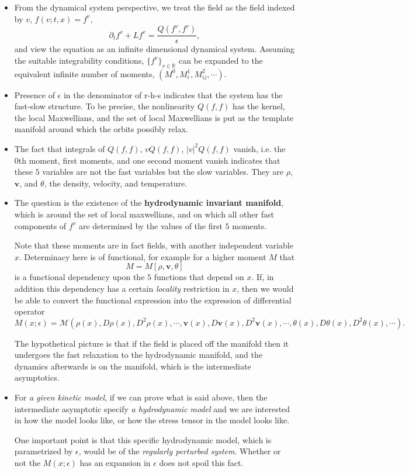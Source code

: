 \documentclass[a4paper,12pt]{article}
\begin{document}
\begin{itemize}
 \item From the dynamical system perspective, we treat the field as the field indexed by $v$, $f(v;t,x)=f^v$,
$$ \partial_t f^{v} + Lf^{v} = \frac{Q(f^v,f^v)}{\epsilon}, $$
and view the equation as an infinite dimensional dynamical system. Assuming the suitable integrability conditions, $\{f^v\}_{v\in \mathbb{R}}$ can be expanded to the equivalent infinite number of moments, $(M^0, M^1_{i}, M^2_{ij}, \cdots)$.
 \item Presence of $\epsilon$ in the denominator of r-h-s indicates that the system has the fast-slow structure. To be precise, the nonlinearity $Q(f,f)$ has the kernel, the local Maxwellians, and the set of local Maxwellians is put as the template manifold around which the orbits possibly relax.
 \item  The fact that integrals of $Q(f,f)$, $vQ(f,f)$, $|v|^2 Q(f,f)$ vanish, i.e. the 0th moment, first moments, and one second moment vanish indicates that these $5$ variables are not the fast variables but the slow variables. They are $\rho$, $\mathbf{v}$, and $\theta$, the density, velocity, and temperature.
 \item The question is the existence of the {\bf hydrodynamic invariant manifold}, which is around the set of local maxwellians, and on which all other fast components of $f^v$ are determined by the values of the first $5$ moments. 
 
 Note that these moments are in fact fields, with another independent variable $x$. Determinacy here is of functional, for example for a higher moment $M$ that
 $$M = M[\rho,\mathbf{v},\theta]$$
 is a functional dependency upon the $5$ functions that depend on $x$. If, in addition this dependency has a certain {\it locality} restriction in $x$, then we would be able to convert the functional expression into the expression of differential operator
 $$M(x;\epsilon)= \mathcal{M}(\rho(x),D\rho(x),D^2\rho(x), \cdots, \mathbf{v}(x), D\mathbf{v}(x), D^2\mathbf{v}(x), \cdots, \theta(x), D\theta(x), D^2\theta(x), \cdots).$$
 
 The hypothetical picture is that if the field is placed off the manifold then it undergoes the fast relaxation to the hydrodynamic manifold, and the dynamics afterwards is on the manifold, which is the intermediate asymptotics. 
 \item For {\it a given kinetic model}, if we can prove what is said above, then the intermediate asymptotic specify {\it a hydrodynamic model} and we are interested in how the model looks like, or how the stress tensor in the model looks like. 
 
 One important point is that this specific hydrodynamic model, which is parametrized by $\epsilon$, would be of the {\it regularly perturbed system}. Whether or not the $M(x;\epsilon)$ has an expansion in $\epsilon$ does not spoil this fact.
\end{itemize}
\end{document}
